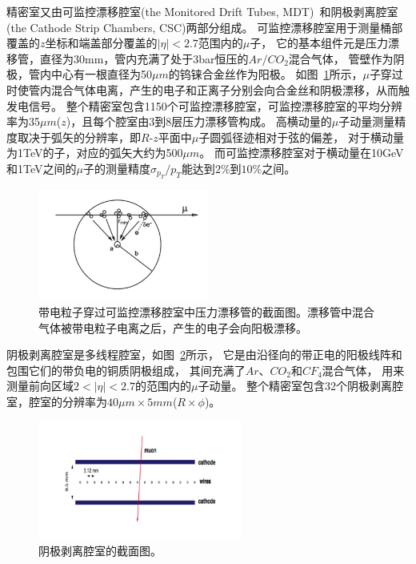 精密室又由可监控漂移腔室(the Monitored Drift Tubes, MDT)~\cite{ATLASMDT}和阴极剥离腔室(the Cathode Strip Chambers, CSC)两部分组成。
可监控漂移腔室用于测量桶部覆盖的$z$坐标和端盖部分覆盖的$|\eta|<2.7$范围内的$\mu$子，
它的基本组件元是压力漂移管，直径为30mm，管内充满了处于3bar恒压的$Ar/CO_2$混合气体，
管壁作为阴极，管内中心有一根直径为50$\mu m$的钨铼合金丝作为阳极。
如图~\ref{fig:ATLASMS1}所示，$\mu$子穿过时使管内混合气体电离，产生的电子和正离子分别会向合金丝和阴极漂移，从而触发电信号。
整个精密室包含1150个可监控漂移腔室，可监控漂移腔室的平均分辨率为35$\mu m$($z$)，且每个腔室由3到8层压力漂移管构成。
高横动量的$\mu$子动量测量精度取决于弧矢的分辨率，即$R$-$z$平面中$\mu$子圆弧径迹相对于弦的偏差，
对于横动量为1TeV的子，对应的弧矢大约为500$\mu m$。
而可监控漂移腔室对于横动量在10GeV和1TeV之间的$\mu$子的测量精度$\sigma_{p_{T}}/p_{T}$能达到$2\%$到$10\%$之间。

\begin{figure}
  \begin{center}
    \includegraphics[width=0.5\textwidth]{figuresEXP/ATLASMS1.jpg}
  \end{center}
  \caption{
带电粒子穿过可监控漂移腔室中压力漂移管的截面图。漂移管中混合气体被带电粒子电离之后，产生的电子会向阳极漂移。
  }
    \label{fig:ATLASMS1}
\end{figure}

阴极剥离腔室是多线程腔室，如图~\ref{fig:ATLASMS2}所示，
它是由沿径向的带正电的阳极线阵和包围它们的带负电的铜质阴极组成，
其间充满了$Ar$、$CO_2$和$CF_4$混合气体，
用来测量前向区域$2<|\eta|<2.7$的范围内的$\mu$子动量。
整个精密室包含32个阴极剥离腔室，腔室的分辨率为$40\mu m\times5mm$($R\times\phi$)。

\begin{figure}
  \begin{center}
    \includegraphics[width=0.6\textwidth]{figuresEXP/ATLASMS2.jpg}
  \end{center}
  \caption{
阴极剥离腔室的截面图。
  }
    \label{fig:ATLASMS2}
\end{figure}


